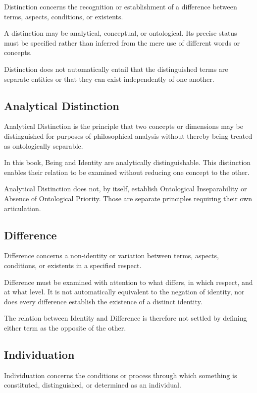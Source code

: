 Distinction concerns the recognition or establishment of a difference
between terms, aspects, conditions, or existents.

A distinction may be analytical, conceptual, or ontological. Its precise
status must be specified rather than inferred from the mere use of
different words or concepts.

Distinction does not automatically entail that the distinguished terms
are separate entities or that they can exist independently of one another.


\subsection*{Analytical Distinction}

Analytical Distinction is the principle that two concepts or dimensions
may be distinguished for purposes of philosophical analysis without
thereby being treated as ontologically separable.

In this book, Being and Identity are analytically distinguishable.
This distinction enables their relation to be examined without reducing
one concept to the other.

Analytical Distinction does not, by itself, establish Ontological
Inseparability or Absence of Ontological Priority. Those are separate
principles requiring their own articulation.


\subsection*{Difference}

Difference concerns a non-identity or variation between terms, aspects,
conditions, or existents in a specified respect.

Difference must be examined with attention to what differs, in which
respect, and at what level. It is not automatically equivalent to the
negation of identity, nor does every difference establish the existence
of a distinct identity.

The relation between Identity and Difference is therefore not settled
by defining either term as the opposite of the other.


\subsection*{Individuation}

Individuation concerns the conditions or process through which something
is constituted, distinguished, or determined as an individual.

